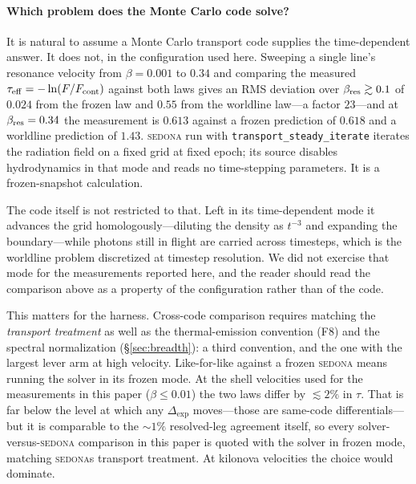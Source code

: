 \documentclass[fleqn,usenatbib]{mnras}
\newcommand{\dexp}{\Delta_{\mathrm{exp}}}
\begin{document}
\paragraph{Which problem does the Monte Carlo code solve?} It is natural to
assume a Monte Carlo transport code supplies the time-dependent answer. It does
not, in the configuration used here. Sweeping a single
line's resonance velocity from $\beta = 0.001$ to $0.34$ and comparing the
measured $\tau_{\rm eff} = -\ln(F/F_{\rm cont})$ against both laws gives an
RMS deviation over $\beta_{\rm res} \gtrsim 0.1$ of $0.024$ from the frozen law
and $0.55$ from the worldline law---a factor $23$---and at
$\beta_{\rm res} = 0.34$ the measurement is $0.613$ against a frozen prediction
of $0.618$ and a worldline prediction of $1.43$. \textsc{sedona} run with
\texttt{transport\_steady\_iterate} iterates the radiation field on a fixed
grid at fixed epoch; its source disables hydrodynamics in that mode and reads
no time-stepping parameters. It is a frozen-snapshot calculation.

The code itself is not restricted to that. Left in its time-dependent mode it
advances the grid homologously---diluting the density as $t^{-3}$ and expanding
the boundary---while photons still in flight are carried across timesteps, which
is the worldline problem discretized at timestep resolution. We did not exercise
that mode for the measurements reported here, and the reader should read the
comparison above as a property of the configuration rather than of the code.

This matters for the harness. Cross-code comparison requires matching the
\emph{transport treatment} as well as the thermal-emission convention (F8) and
the spectral normalization (\S\ref{sec:breadth}): a third convention, and the
one with the largest lever arm at high velocity. Like-for-like against a frozen
\textsc{sedona} means running the solver in its frozen mode. At the shell
velocities used for the measurements in this paper ($\beta \le 0.01$) the two
laws differ by $\lesssim 2\%$ in $\tau$. That is far below the level at
which any $\dexp$ moves---those are same-code differentials---but it is
comparable to the $\sim1\%$ resolved-leg agreement itself, so every
solver-versus-\textsc{sedona} comparison in this paper is quoted with the
solver in frozen mode, matching \textsc{sedona}s transport treatment. At
kilonova velocities the choice would dominate.
\end{document}
